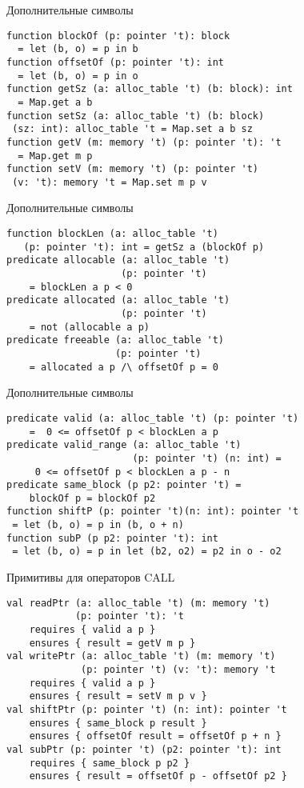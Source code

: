 \documentclass[hyperref={unicode=true}]{beamer}
\begin{document}
    \begin{frame}[fragile]{Дополнительные символы}
    \begin{lstlisting}
function blockOf (p: pointer 't): block
  = let (b, o) = p in b
function offsetOf (p: pointer 't): int
  = let (b, o) = p in o
function getSz (a: alloc_table 't) (b: block): int
  = Map.get a b
function setSz (a: alloc_table 't) (b: block)
 (sz: int): alloc_table 't = Map.set a b sz
function getV (m: memory 't) (p: pointer 't): 't
  = Map.get m p
function setV (m: memory 't) (p: pointer 't)
 (v: 't): memory 't = Map.set m p v
    \end{lstlisting}
    \end{frame}

    \begin{frame}[fragile]{Дополнительные символы}
    \begin{lstlisting}
function blockLen (a: alloc_table 't)
   (p: pointer 't): int = getSz a (blockOf p)
predicate allocable (a: alloc_table 't)
                    (p: pointer 't)
    = blockLen a p < 0
predicate allocated (a: alloc_table 't)
                    (p: pointer 't)
    = not (allocable a p)
predicate freeable (a: alloc_table 't)
                   (p: pointer 't)
    = allocated a p /\ offsetOf p = 0
    \end{lstlisting}
    \end{frame}

    \begin{frame}[fragile]{Дополнительные символы}
    \begin{lstlisting}
predicate valid (a: alloc_table 't) (p: pointer 't)
    =  0 <= offsetOf p < blockLen a p
predicate valid_range (a: alloc_table 't)
                      (p: pointer 't) (n: int) =
     0 <= offsetOf p < blockLen a p - n
predicate same_block (p p2: pointer 't) =
    blockOf p = blockOf p2
function shiftP (p: pointer 't)(n: int): pointer 't
 = let (b, o) = p in (b, o + n)
function subP (p p2: pointer 't): int
 = let (b, o) = p in let (b2, o2) = p2 in o - o2
    \end{lstlisting}
    \end{frame}

    \begin{frame}[fragile]{Примитивы для операторов CALL}
    \begin{lstlisting}
val readPtr (a: alloc_table 't) (m: memory 't)
            (p: pointer 't): 't
    requires { valid a p }
    ensures { result = getV m p }
val writePtr (a: alloc_table 't) (m: memory 't)
             (p: pointer 't) (v: 't): memory 't
    requires { valid a p }
    ensures { result = setV m p v }
val shiftPtr (p: pointer 't) (n: int): pointer 't
    ensures { same_block p result }
    ensures { offsetOf result = offsetOf p + n }
val subPtr (p: pointer 't) (p2: pointer 't): int
    requires { same_block p p2 }
    ensures { result = offsetOf p - offsetOf p2 }
    \end{lstlisting}
    \end{frame}
\end{document}
